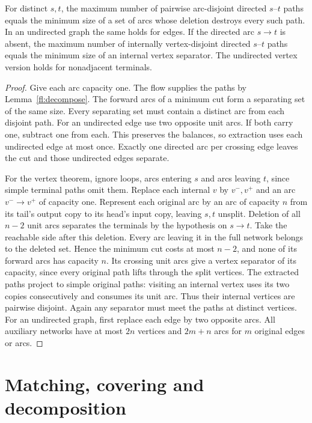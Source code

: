 \begin{theorem}\leavevmode\label{fl:menger}
For distinct $s,t$, the maximum number of pairwise arc-disjoint
directed $s$--$t$ paths equals the minimum size of a set of arcs whose
deletion destroys every such path. In an undirected graph the same
holds for edges. If the directed arc $s\to t$ is absent, the maximum
number of internally vertex-disjoint directed $s$--$t$ paths equals
the minimum size of an internal vertex separator. The undirected
vertex version holds for nonadjacent terminals.
\end{theorem}
\begin{proof}
Give each arc capacity one. The flow supplies the paths by
Lemma~\ref{fl:decompose}. The forward arcs of a minimum cut form
a separating set of the same size. Every separating set must contain
a distinct arc from each disjoint path. For an undirected edge use
two opposite unit arcs. If both carry one, subtract one from each.
This preserves the balances, so extraction uses each undirected edge
at most once. Exactly one directed arc per crossing edge leaves the
cut and those undirected edges separate.

For the vertex theorem, ignore loops, arcs entering $s$ and arcs leaving
$t$, since simple terminal paths omit them. Replace each internal
$v$ by $v^-,v^+$ and an arc $v^-\to v^+$ of capacity one. Represent each
original arc by an arc of capacity $n$ from its tail's output copy to
its head's input copy, leaving $s,t$ unsplit. Deletion of all $n-2$
unit arcs separates the terminals by the hypothesis on $s\to t$.
Take the reachable side after this deletion. Every arc leaving it in
the full network belongs to the deleted set. Hence the minimum cut
costs at most $n-2$, and none of its forward arcs has capacity $n$.
Its crossing unit arcs give a vertex separator of its capacity, since
every original path lifts through the split vertices. The extracted
paths project to simple original paths: visiting an internal vertex
uses its two copies consecutively and consumes its unit arc. Thus
their internal vertices are pairwise disjoint. Again any separator
must meet the paths at distinct vertices. For an undirected graph,
first replace each edge by two opposite arcs. All auxiliary networks
have at most $2n$ vertices and $2m+n$ arcs for $m$ original edges or arcs.
\end{proof}

\section{Matching, covering and decomposition}\label{fl:matching}

